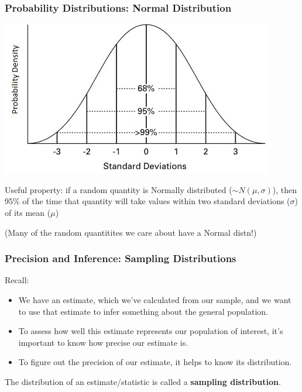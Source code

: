 \documentclass[12pt, 
hyperref={colorlinks=true, linkcolor=blue, urlcolor=cyan}]{beamer}
\begin{document}
\begin{frame}
\frametitle{Probability Distributions: Normal Distribution}

\begin{center} \includegraphics[height=0.4\textheight]{./Normal} \end{center}

\vspace{-0.3cm} \color{blue} Useful property: \color{black} if a random quantity is Normally distributed ($\sim N(\mu,\sigma)$), then 95\% of the time that quantity will take values within two standard deviations ($\sigma$) of its mean ($\mu$)

\begin{footnotesize} (Many of the random quantitites we care about have a Normal distn!)\\ \end{footnotesize}

\end{frame}

\begin{frame}
\frametitle{Precision and Inference: Sampling Distributions}

Recall: \vspace{-0.3cm}
\begin{itemize}
\item We have an estimate, which we've calculated from our sample, and we want to use that estimate to infer something about the general population.
\item To assess how well this estimate represents our population of interest, it's important to know how precise our estimate is. 
\item To figure out the precision of our estimate, it helps to know its distribution.
\end{itemize}

The distribution of an estimate/statistic is called a \textbf{sampling distribution}.

\end{frame}
\end{document}
